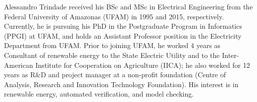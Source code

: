 \documentclass[journal]{IEEEtran}
\begin{document}



{}
%
%
%
% 
\begin{IEEEbiography}
    {Alessandro Trindade}
received his BSc and MSc in Electrical Engineering from the Federal University of Amazonas (UFAM) in 1995 and 2015, respectively. Currently, he is pursuing his PhD in the Postgraduate Program in Informatics (PPGI) at UFAM, and holds an Assistant Professor position in the Electricity Department from UFAM. Prior to joining UFAM, he worked 4 years as Consultant of renewable energy to the State Electric Utility and to the Inter-American Institute for Cooperation on Agriculture (IICA); he also worked for 12 years as R\&D and project manager at a non-profit foundation (Centre of Analysis, Research and Innovation Technology Foundation). His interest is in renewable energy, automated verification, and model checking.
\end{IEEEbiography}
\end{document}
